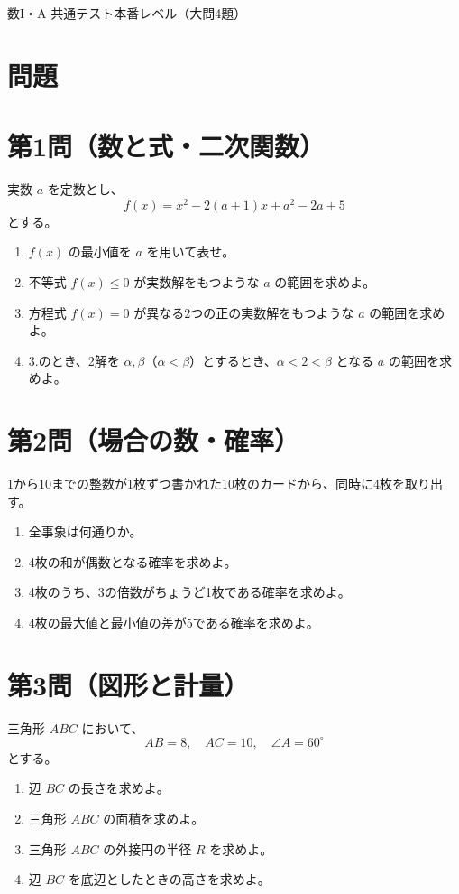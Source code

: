 \documentclass[a4paper,12pt]{jsarticle}
\begin{document}
\begin{center}
{\LARGE 数I・A 共通テスト本番レベル（大問4題）}
\end{center}

\vspace{1em}

\section*{問題}

\section*{第1問（数と式・二次関数）}
実数 \(a\) を定数とし、
\[
f(x)=x^2-2(a+1)x+a^2-2a+5
\]
とする。
\begin{enumerate}[label=\arabic*.]
  \item \(f(x)\) の最小値を \(a\) を用いて表せ。
  \item 不等式 \(f(x)\le 0\) が実数解をもつような \(a\) の範囲を求めよ。
  \item 方程式 \(f(x)=0\) が異なる2つの正の実数解をもつような \(a\) の範囲を求めよ。
  \item 3.のとき、2解を \(\alpha,\beta\)（\(\alpha<\beta\)）とするとき、\(\alpha<2<\beta\) となる \(a\) の範囲を求めよ。
\end{enumerate}

\section*{第2問（場合の数・確率）}
1から10までの整数が1枚ずつ書かれた10枚のカードから、同時に4枚を取り出す。
\begin{enumerate}[label=\arabic*.]
  \item 全事象は何通りか。
  \item 4枚の和が偶数となる確率を求めよ。
  \item 4枚のうち、3の倍数がちょうど1枚である確率を求めよ。
  \item 4枚の最大値と最小値の差が5である確率を求めよ。
\end{enumerate}

\section*{第3問（図形と計量）}
三角形 \(ABC\) において、
\[
AB=8,\quad AC=10,\quad \angle A=60^\circ
\]
とする。
\begin{enumerate}[label=\arabic*.]
  \item 辺 \(BC\) の長さを求めよ。
  \item 三角形 \(ABC\) の面積を求めよ。
  \item 三角形 \(ABC\) の外接円の半径 \(R\) を求めよ。
  \item 辺 \(BC\) を底辺としたときの高さを求めよ。
\end{enumerate}
\end{document}
